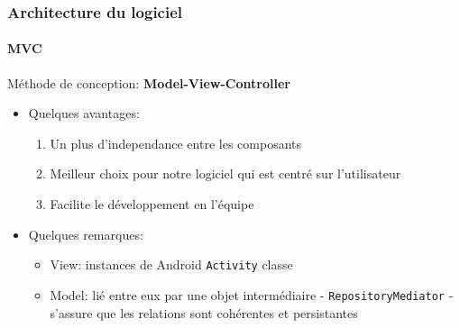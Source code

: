 \documentclass[15pt]{beamer}
\begin{document}
\begin{frame}
 \frametitle{Architecture du logiciel}
  \framesubtitle{MVC}
\begin{center}
 M\'ethode de conception: \textbf{Model-View-Controller}
\end{center}

\begin{itemize}
 \item Quelques avantages: 
  \begin{enumerate}
   \item Un plus d'independance entre les composants
   \item Meilleur choix pour notre logiciel qui est centr\'e sur l'utilisateur
   \item Facilite le d\'eveloppement en l'\'equipe
  \end{enumerate}

\item Quelques remarques: 
  \begin{itemize}
   \item View: instances de Android \texttt{Activity} classe
   \item Model: li\'e entre eux par une objet interm\'ediaire - \texttt{RepositoryMediator} - s'assure que les relations sont coh\'erentes et persistantes
  \end{itemize}
 
\end{itemize}
\end{frame}
\end{document}

